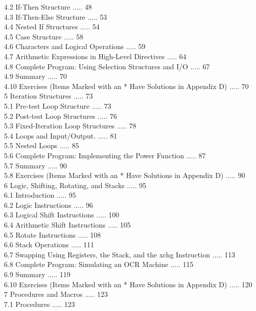 \documentclass[10pt]{article}
\begin{document}
4.2 If-Then Structure ..... 48\\
4.3 If-Then-Else Structure ..... 53\\
4.4 Nested If Structures ..... 54\\
4.5 Case Structure ..... 58\\
4.6 Characters and Logical Operations ..... 59\\
4.7 Arithmetic Expressions in High-Level Directives ..... 64\\
4.8 Complete Program: Using Selection Structures and I/O ..... 67\\
4.9 Summary ..... 70\\
4.10 Exercises (Items Marked with an * Have Solutions in Appendix D) ..... 70\\
5 Iteration Structures ..... 73\\
5.1 Pre-test Loop Structure ..... 73\\
5.2 Post-test Loop Structures ..... 76\\
5.3 Fixed-Iteration Loop Structures ..... 78\\
5.4 Loops and Input/Output. ..... 81\\
5.5 Nested Loops ..... 85\\
5.6 Complete Program: Implementing the Power Function ..... 87\\
5.7 Summary ..... 90\\
5.8 Exercises (Items Marked with an * Have Solutions in Appendix D) ..... 90\\
6 Logic, Shifting, Rotating, and Stacks ..... 95\\
6.1 Introduction ..... 95\\
6.2 Logic Instructions ..... 96\\
6.3 Logical Shift Instructions ..... 100\\
6.4 Arithmetic Shift Instructions ..... 105\\
6.5 Rotate Instructions ..... 108\\
6.6 Stack Operations ..... 111\\
6.7 Swapping Using Registers, the Stack, and the xchg Instruction ..... 113\\
6.8 Complete Program: Simulating an OCR Machine ..... 115\\
6.9 Summary ..... 119\\
6.10 Exercises (Items Marked with an * Have Solutions in Appendix D) ..... 120\\
7 Procedures and Macros ..... 123\\
7.1 Procedures ..... 123\\
\end{document}
